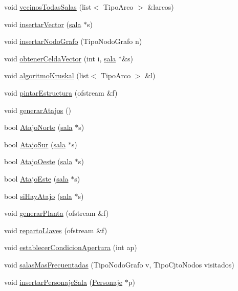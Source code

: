 \begin{CompactItemize}
\item 
void \hyperlink{classplanta_8f751a6905970cdc9922b9662b33f24c}{vecinosTodasSalas} (list$<$ TipoArco $>$ \&larcos)
\item 
void \hyperlink{classplanta_878639aab40d24f515031619abbd7a61}{insertarVector} (\hyperlink{classsala}{sala} $\ast$s)
\item 
void \hyperlink{classplanta_8ba7df6396d9bad77c0f65a729e85ec6}{insertarNodoGrafo} (TipoNodoGrafo n)
\item 
void \hyperlink{classplanta_c97835a31f875ecdc01f33517dfc71d4}{obtenerCeldaVector} (int i, \hyperlink{classsala}{sala} $\ast$\&s)
\item 
void \hyperlink{classplanta_af4bebbde71513fa6496c3f60d0214f3}{algoritmoKruskal} (list$<$ TipoArco $>$ \&l)
\item 
void \hyperlink{classplanta_b4ffd08f4b41a91e0f1ad667e2e9014f}{pintarEstructura} (ofstream \&f)
\item 
void \hyperlink{classplanta_d9f49ae6d392d9f7de7320140c87b285}{generarAtajos} ()
\item 
bool \hyperlink{classplanta_894574ebadf95dc0fd29a692f4c8e563}{AtajoNorte} (\hyperlink{classsala}{sala} $\ast$s)
\item 
bool \hyperlink{classplanta_6f30a6db1b7f9796a8608348bb438efb}{AtajoSur} (\hyperlink{classsala}{sala} $\ast$s)
\item 
bool \hyperlink{classplanta_289d62512ce27210c8d2b065c2e1ad7f}{AtajoOeste} (\hyperlink{classsala}{sala} $\ast$s)
\item 
bool \hyperlink{classplanta_9de280e30bde3f6acd5f758567f39ad6}{AtajoEste} (\hyperlink{classsala}{sala} $\ast$s)
\item 
bool \hyperlink{classplanta_6420d2f76781945da90ff6187967694d}{siHayAtajo} (\hyperlink{classsala}{sala} $\ast$s)
\item 
void \hyperlink{classplanta_8fab738328778b64c683e169a2aa58dc}{generarPlanta} (ofstream \&f)
\item 
void \hyperlink{classplanta_99d7ef1836db1ae602104e1878f5f430}{repartoLlaves} (ofstream \&f)
\item 
void \hyperlink{classplanta_5a10e66e70a71d957e1dde4a019b8280}{establecerCondicionApertura} (int ap)
\item 
void \hyperlink{classplanta_12c7cfe94fb585ff80db86046756e3d9}{salasMasFrecuentadas} (TipoNodoGrafo v, TipoCjtoNodos visitados)
\item 
void \hyperlink{classplanta_b2856a872a24f50fb52dd6b35e878c55}{insertarPersonajeSala} (\hyperlink{classPersonaje}{Personaje} $\ast$p)

\end{CompactItemize}
